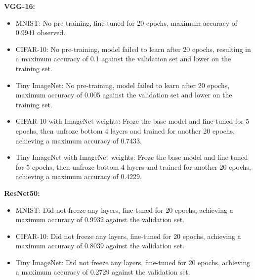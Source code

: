 \documentclass[letterpaper]{article}
\begin{document}
\textbf{VGG-16:} 
\begin{itemize}
    \item MNIST: No pre-training, fine-tuned for 20 epochs, maximum accuracy of 0.9941 observed.
    \item CIFAR-10: No pre-training, model failed to learn after 20 epochs, resulting in a maximum accuracy of 0.1 against the validation set and lower on the training set.
    \item Tiny ImageNet: No pre-training, model failed to learn after 20 epochs, maximum accuracy of 0.005 against the validation set and lower on the training set.
    \item CIFAR-10 with ImageNet weights: Froze the base model and fine-tuned for 5 epochs, then unfroze bottom 4 layers and trained for another 20 epochs, achieving a maximum accuracy of 0.7433.
    \item Tiny ImageNet with ImageNet weights: Froze the base model and fine-tuned for 5 epochs, then unfroze bottom 4 layers and trained for another 20 epochs, achieving a maximum accuracy of 0.4229.
\end{itemize}

\textbf{ResNet50:} 
\begin{itemize}
    \item MNIST: Did not freeze any layers, fine-tuned for 20 epochs, achieving a maximum accuracy of 0.9932 against the validation set.
    \item CIFAR-10: Did not freeze any layers, fine-tuned for 20 epochs, achieving a maximum accuracy of 0.8039 against the validation set.
    \item Tiny ImageNet: Did not freeze any layers, fine-tuned for 20 epochs, achieving a maximum accuracy of 0.2729 against the validation set.
\end{itemize}
\end{document}
